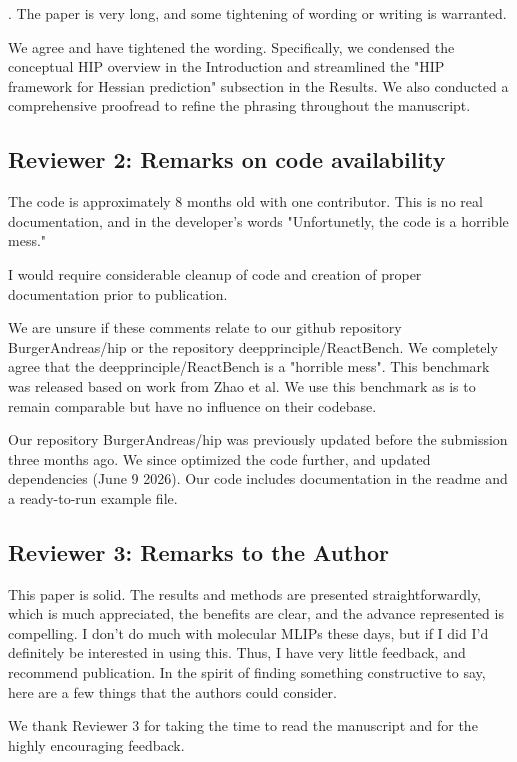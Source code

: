 \documentclass[pdflatex,sn-mathphys-num]{sn-jnl}
\begin{document}
. The paper is very long, and some tightening of wording or writing is warranted.


{\color{mycustomcolour}
\noindent We agree and have tightened the wording. Specifically, we condensed the conceptual HIP overview in the Introduction and streamlined the "HIP framework for Hessian prediction" subsection in the Results. We also conducted a comprehensive proofread to refine the phrasing throughout the manuscript.
}

\subsection*{Reviewer 2: Remarks on code availability}
The code is approximately 8 months old with one contributor. This is no real documentation, and in the developer's words "Unfortunetly, the code is a horrible mess."

I would require considerable cleanup of code and creation of proper documentation prior to publication.

{\color{mycustomcolour}
\noindent We are unsure if these comments relate to our github repository BurgerAndreas/hip or the repository deepprinciple/ReactBench. We completely agree that the deepprinciple/ReactBench is a "horrible mess". This benchmark was released based on work from Zhao et al. We use this benchmark as is to remain comparable but have no influence on their codebase.

Our repository BurgerAndreas/hip was previously updated before the submission three months ago. We since optimized the code further, and updated dependencies (June 9 2026). Our code includes documentation in the readme and a ready-to-run example file.
}


\subsection*{Reviewer 3: Remarks to the Author}
This paper is solid. The results and methods are presented straightforwardly, which is much appreciated, the benefits are clear, and the advance represented is compelling. I don’t do much with molecular MLIPs these days, but if I did I’d definitely be interested in using this. Thus, I have very little feedback, and recommend publication. In the spirit of finding something constructive to say, here are a few things that the authors could consider.

{\color{mycustomcolour}
\noindent We thank Reviewer 3 for taking the time to read the manuscript and for the highly encouraging feedback.
}
\vspace{2mm}
\end{document}

